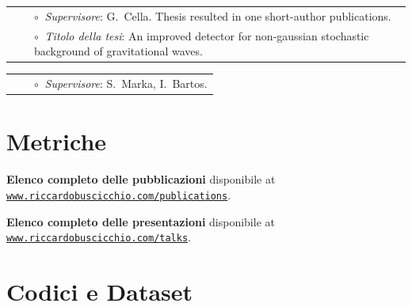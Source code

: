 %

\vspace{0.2cm}
\vspace{-0.1cm}
\begin{tabular}{rcl}
%
&\hspace{0.4cm} &$\circ\;\;${\textit{Supervisore}}: G.~Cella. Thesis resulted in one short-author publications.\\
&\hspace{0.4cm} &$\circ\;\;${\textit{Titolo della tesi}}: An improved detector for non-gaussian stochastic background of gravitational waves.
\end{tabular}
\vspace{0.2cm}

%

\vspace{0.2cm}
\vspace{-0.1cm}
\begin{tabular}{rcl}
&\hspace{0.4cm} &$\circ\;\;${\textit{Supervisore}}: S.~Marka, I.~Bartos.
\end{tabular}
\vspace{0.2cm}

%

%


%

\section{Metriche}



\textbf{Elenco completo delle pubblicazioni} disponibile 
%
at \href{http://www.riccardobuscicchio.com/publications}{\texttt{www.riccardobuscicchio.com/publications}}.

%

\textbf{Elenco completo delle presentazioni} disponibile
%
at \href{http://www.riccardobuscicchio.com/talks}{\texttt{www.riccardobuscicchio.com/talks}}.

\section{Codici e Dataset}
 


